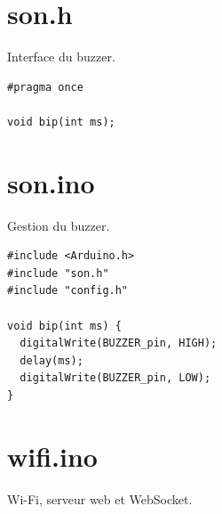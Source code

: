 \documentclass[a4paper,10pt]{article}
\begin{document}
\section{son.h}
Interface du buzzer.

\begin{lstlisting}
#pragma once

void bip(int ms);
\end{lstlisting}

\section{son.ino}
Gestion du buzzer.

\begin{lstlisting}
#include <Arduino.h>
#include "son.h"
#include "config.h"

void bip(int ms) {
  digitalWrite(BUZZER_pin, HIGH);
  delay(ms);
  digitalWrite(BUZZER_pin, LOW);
}
\end{lstlisting}

\section{wifi.ino}
Wi-Fi, serveur web et WebSocket.
\end{document}
